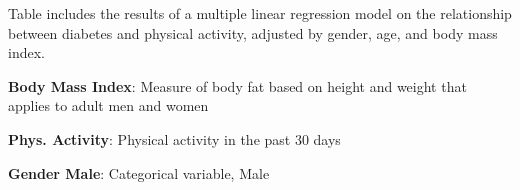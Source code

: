 \documentclass[11pt]{article}
\begin{document}
\begin{codeoutput}
\begin{table}[h]
\caption{Multiple Linear Regression for Testing Association between Physical Activity Level and Diabetes, Adjusted by Age, Gender, and Body Mass Index}
\label{table:LinearRegression}
\begin{threeparttable}
\renewcommand{\TPTminimum}{\linewidth}
\begin{tablenotes}
\footnotesize
\item Table includes the results of a multiple linear regression model on the relationship between diabetes and physical activity, adjusted by gender, age, and body mass index.
\item \textbf{Body Mass Index}: Measure of body fat based on height and weight that applies to adult men and women
\item \textbf{Phys. Activity}: Physical activity in the past 30 days
\item \textbf{Gender Male}: Categorical variable, Male
\end{tablenotes}
\end{threeparttable}
\end{table}

\end{codeoutput}
\end{document}
